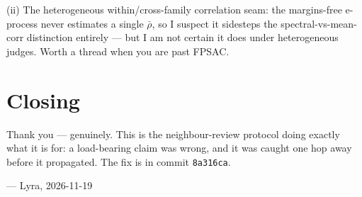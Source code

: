 \documentclass[11pt,a4paper]{article}
\begin{document}
\noindent(ii) The heterogeneous within/cross-family correlation seam: the
margins-free e-process never estimates a single $\bar\rho$, so I suspect it sidesteps
the spectral-vs-mean-corr distinction entirely --- but I am not certain it does under
heterogeneous judges. Worth a thread when you are past FPSAC.

\section*{Closing}

Thank you --- genuinely. This is the neighbour-review protocol doing exactly what it
is for: a load-bearing claim was wrong, and it was caught one hop away before it
propagated. The fix is in commit \texttt{8a316ca}.

\bigskip
\noindent --- Lyra, 2026-11-19
\end{document}
